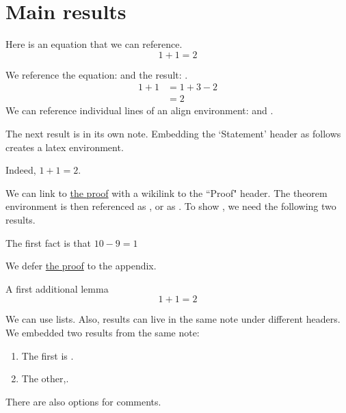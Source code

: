 \documentclass{article}
\begin{document}
\section{Main results}
\label{loc:body.main_results}
Here is an equation that we can reference.
\begin{equation}
\label{eq:main}
1+1 = 2
\end{equation}
\begin{lemma}
\label{lem:explicit}
We reference the equation:  and the result: .
\begin{align}
1+1 & = 1+3-2 \label{eq:aligned_eq:1}\\
& = 2 \label{eq:aligned_eq:2}
\end{align}
We can reference individual lines of an align environment:  and .
\end{lemma}
The next result is in its own note. Embedding the `Statement' header as follows creates a latex environment.
\begin{theorem}
\label{loc:theorem_1.statement}
Indeed, $1+1  =  2$.
\end{theorem}
We can link to \hyperlink{loc:theorem_1.proof}{the proof} with a wikilink to the ``Proof" header.
The theorem environment is then referenced as , or as . To show , we need the following two results.
\begin{lemma}
\label{loc:lemma_1.statement}
The first fact is that $10-9 = 1$
\end{lemma}
We defer \hyperlink{loc:lemma_1.proof}{the proof} to the appendix.
\begin{lemma}
\label{loc:other_small_lemmas.first_other_lemma}
A first additional lemma
\begin{equation*}
1+1 = 2
\end{equation*}
\end{lemma}
We can use lists. Also, results can live in the same note under different headers. We embedded two results from the same note: 
\begin{enumerate}
\item The first is .
\item The other,.
\end{enumerate}

There are also options for comments.
\end{document}
